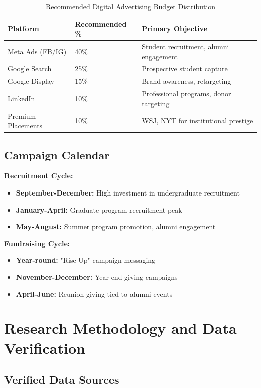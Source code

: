 \documentclass[12pt,letterpaper]{article}
\begin{document}
\begin{table}[h]
\centering
\begin{tabular}{@{}lll@{}}
\toprule
\textbf{Platform} & \textbf{Recommended \%} & \textbf{Primary Objective} \\
\midrule
Meta Ads (FB/IG) & 40\% & Student recruitment, alumni engagement \\
Google Search & 25\% & Prospective student capture \\
Google Display & 15\% & Brand awareness, retargeting \\
LinkedIn & 10\% & Professional programs, donor targeting \\
Premium Placements & 10\% & WSJ, NYT for institutional prestige \\
\bottomrule
\end{tabular}
\caption{Recommended Digital Advertising Budget Distribution}
\end{table}

\subsection{Campaign Calendar}

\textbf{Recruitment Cycle:}
\begin{itemize}[leftmargin=*]
    \item \textbf{September-December:} High investment in undergraduate recruitment
    \item \textbf{January-April:} Graduate program recruitment peak
    \item \textbf{May-August:} Summer program promotion, alumni engagement
\end{itemize}

\textbf{Fundraising Cycle:}
\begin{itemize}[leftmargin=*]
    \item \textbf{Year-round:} "Rise Up" campaign messaging
    \item \textbf{November-December:} Year-end giving campaigns
    \item \textbf{April-June:} Reunion giving tied to alumni events
\end{itemize}

\section{Research Methodology and Data Verification}

\subsection{Verified Data Sources}
\end{document}
